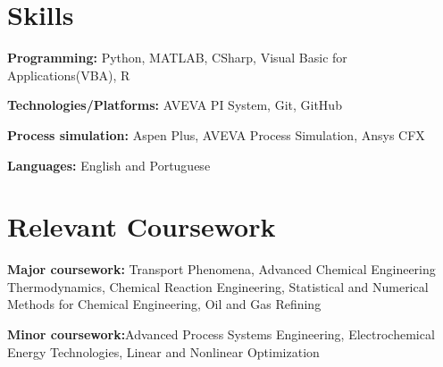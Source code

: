\documentclass[letterpaper,11pt]{article}
\newcommand{\resumeSubHeadingListStart}{\begin{itemize}[leftmargin=0.15in, label={}]}
\newcommand{\resumeSubHeadingListEnd}{\end{itemize}}
\begin{document}

\section{Skills}
  \vspace{2pt}
  \resumeSubHeadingListStart
    \small{\item{
        \textbf{Programming:}{ Python, MATLAB, CSharp, Visual Basic for Applications(VBA), R} \\ \vspace{3pt}
        
        \textbf{Technologies/Platforms:}{ AVEVA PI System, Git, GitHub} \\ \vspace{3pt}

        \textbf{Process simulation:}{ Aspen Plus, AVEVA Process Simulation, Ansys CFX} \\ \vspace{3pt}
        
        \textbf{Languages:}{ English and Portuguese}
        
    }}
  \resumeSubHeadingListEnd




\section{Relevant Coursework}
  \vspace{2pt}
  \resumeSubHeadingListStart
    \small{\item{
        \textbf{Major coursework:}{ Transport Phenomena, Advanced Chemical Engineering Thermodynamics, Chemical Reaction Engineering, Statistical and Numerical Methods for Chemical Engineering, Oil and Gas Refining} \\ \vspace{3pt}
        
        \textbf{Minor coursework:}{Advanced Process Systems Engineering, Electrochemical Energy Technologies,  Linear and Nonlinear Optimization}
    }}
  \resumeSubHeadingListEnd
\end{document}
